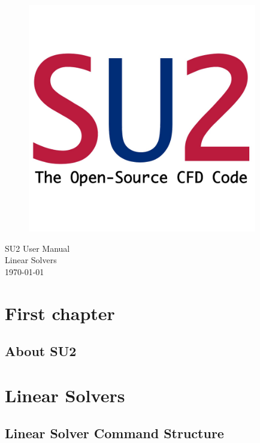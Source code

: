 \documentclass{book} %
\begin{document}
\frontmatter

\begin{titlepage}
\begin{figure}[bh]
\centering
\includegraphics[width=10cm]{SU2_Logo}
\end{figure}
\begin{center}
\Huge
SU2 User Manual \\
Linear Solvers \\
\today
\end{center}
\end{titlepage}

\mainmatter
\chapter{First chapter}

    \section{About SU2}


\chapter{Linear Solvers}

    \section{Linear Solver Command Structure}
    
\end{document}
